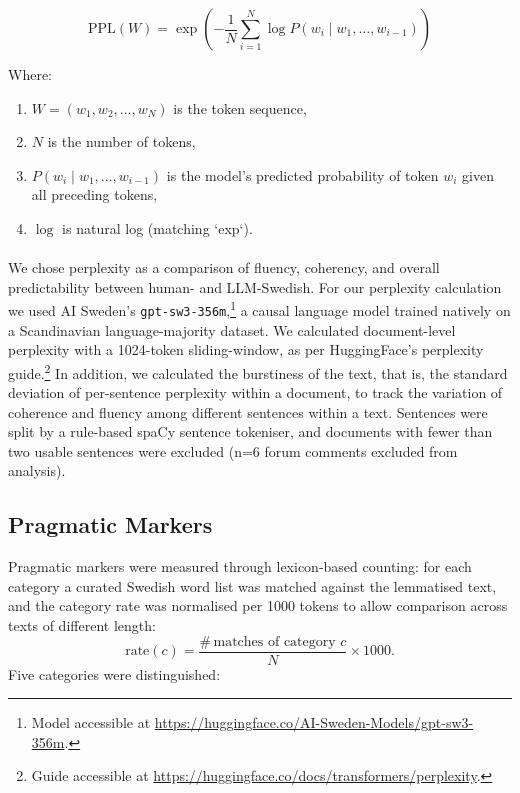 \documentclass[thesis]{cluu}
\begin{document}
\begin{equation}
\text{PPL}(W) = \exp\left(-\frac{1}{N}\sum_{i=1}^{N} \log P(w_i \mid w_1, \dots, w_{i-1})\right)
\label{eq:perplexity}
\end{equation}

Where:
\begin{enumerate}
    \item $W = (w_1, w_2, \dots, w_N)$ is the token sequence,
    \item $N$ is the number of tokens,
    \item $P(w_i \mid w_1, \dots, w_{i-1})$ is the model's predicted probability of token $w_i$ given all preceding tokens,
    \item $\log$ is natural log (matching `exp`).
\end{enumerate}
\paragraph{}
We chose perplexity as a comparison of fluency, coherency, and overall predictability between human- and LLM-Swedish. For our perplexity calculation we used AI Sweden's \texttt{gpt-sw3-356m},\footnote{Model accessible at \url{https://huggingface.co/AI-Sweden-Models/gpt-sw3-356m}.} a causal language model trained natively on a Scandinavian language-majority dataset. We calculated document-level perplexity with a  1024-token sliding-window, as per HuggingFace's perplexity guide.\footnote{Guide accessible at \url{https://huggingface.co/docs/transformers/perplexity}.} In addition, we calculated the burstiness of the text, that is, the standard deviation of per-sentence perplexity within a document, to track the variation of coherence and fluency among different sentences within a text. Sentences were split by a rule-based spaCy sentence tokeniser, and documents with fewer than two usable sentences were excluded (n=6 forum comments excluded from analysis).


\subsection{Pragmatic Markers}
Pragmatic markers were measured through lexicon-based counting: for each category a
curated Swedish word list was matched against the lemmatised text, and the
category rate was normalised per 1000 tokens to allow comparison across texts of
different length:
\begin{equation}
\mathrm{rate}(c) = \frac{\#\,\text{matches of category } c}{N}\times 1000 .
\end{equation}
Five categories were distinguished:
\end{document}
